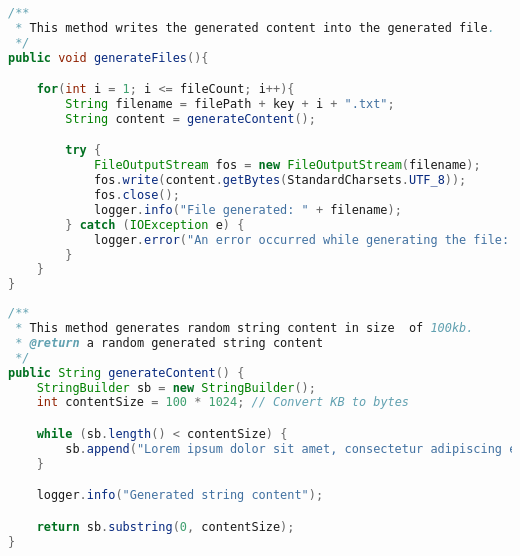 \begin{lstlisting}[language=Java, caption=generateFiles() Methode der Klasse PerformanceTest]
/**
 * This method writes the generated content into the generated file.
 */
public void generateFiles(){

    for(int i = 1; i <= fileCount; i++){
        String filename = filePath + key + i + ".txt";
        String content = generateContent();

        try {
            FileOutputStream fos = new FileOutputStream(filename);
            fos.write(content.getBytes(StandardCharsets.UTF_8));
            fos.close();
            logger.info("File generated: " + filename);
        } catch (IOException e) {
            logger.error("An error occurred while generating the file: " + e.getMessage());
        }
    }
}
\end{lstlisting}

\newpage

\begin{lstlisting}[language=Java, caption=generateContent() Methode der Klasse PerformanceTest]
/**
 * This method generates random string content in size  of 100kb.
 * @return a random generated string content
 */
public String generateContent() {
    StringBuilder sb = new StringBuilder();
    int contentSize = 100 * 1024; // Convert KB to bytes

    while (sb.length() < contentSize) {
        sb.append("Lorem ipsum dolor sit amet, consectetur adipiscing elit. ");
    }

    logger.info("Generated string content");

    return sb.substring(0, contentSize);
}
\end{lstlisting}

\newpage


\clearpage